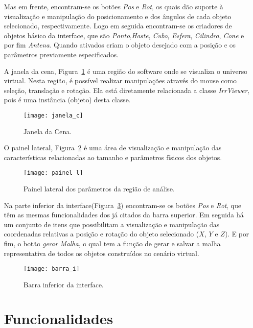 	Mas em frente, encontram-se os botões \textit{Pos} e \textit{Rot}, os quais dão suporte à visualização e manipulação do posicionamento e dos ângulos de cada objeto selecionado, respectivamente. Logo em seguida encontram-se os criadores de objetos básico da interface, que são \textit{Ponto},\textit{Haste}, \textit{Cubo}, \textit{Esfera}, \textit{Cilindro}, \textit{Cone} e por fim \textit{Antena}. Quando ativados criam o objeto desejado com a posição e os parâmetros previamente especificados.

	A janela da cena, Figura~\ref{fg:janela_c} é uma região do software onde se visualiza o universo virtual. Nesta região, é possível realizar manipulações através do mouse como seleção, translação e rotação. Ela está diretamente relacionada a classe \textit{IrrViewer}, pois é uma instância (objeto) desta classe. 

\begin{figure}[!ht]
	\centering
	\texttt{[image: janela\_c]}
	\caption{Janela da Cena.}
	\label{fg:janela_c}
\end{figure}

	O painel lateral, Figura~\ref{fg:painel_l} é uma área de visualização e manipulação das características relacionadas ao tamanho e parâmetros físicos dos objetos.

\begin{figure}[!ht]
	\centering
	\texttt{[image: painel\_l]}
	\caption{Painel lateral dos parâmetros da região de análise.}
	\label{fg:painel_l}
\end{figure}

	Na parte inferior da interface(Figura~\ref{fg:barra_i}) encontram-se os botões \textit{Pos} e \textit{Rot}, que têm as mesmas funcionalidades dos já citados da barra superior. Em seguida  há um conjunto de itens que possibilitam a visualização e manipulação das coordenadas relativas a posição e rotação do objeto selecionado ($X$, $Y$ e $Z$). E por fim, o botão \textit{gerar Malha}, o qual tem a função de gerar e salvar a malha representativa de todos os  objetos construídos no cenário virtual.

\begin{figure}[!ht]
	\centering
	\texttt{[image: barra\_i]}
	\caption{Barra inferior da interface.}
	\label{fg:barra_i}
\end{figure}

\section{Funcionalidades}

